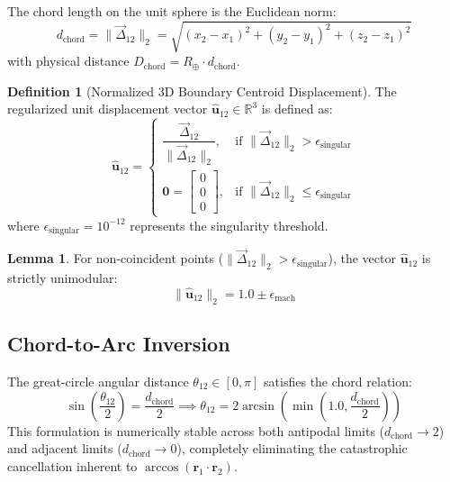 \documentclass[11pt,a4paper]{article}
\theoremstyle{definition}
\newtheorem{definition}{Definition}
\newtheorem{lemma}{Lemma}
\begin{document}
The chord length on the unit sphere is the Euclidean norm:
\begin{equation}
d_{\text{chord}} = \|\vec{\Delta}_{12}\|_2 = \sqrt{(x_2 - x_1)^2 + (y_2 - y_1)^2 + (z_2 - z_1)^2}
\end{equation}
with physical distance $D_{\text{chord}} = R_{\oplus} \cdot d_{\text{chord}}$.

\begin{definition}[Normalized 3D Boundary Centroid Displacement]
The regularized unit displacement vector $\hat{\mathbf{u}}_{12} \in \mathbb{R}^3$ is defined as:
\begin{equation}
\hat{\mathbf{u}}_{12} = 
\begin{cases}
\dfrac{\vec{\Delta}_{12}}{\|\vec{\Delta}_{12}\|_2}, & \text{if } \|\vec{\Delta}_{12}\|_2 > \epsilon_{\text{singular}} \\
\mathbf{0} = \begin{bmatrix} 0 \\ 0 \\ 0 \end{bmatrix}, & \text{if } \|\vec{\Delta}_{12}\|_2 \le \epsilon_{\text{singular}}
\end{cases}
\end{equation}
where $\epsilon_{\text{singular}} = 10^{-12}$ represents the singularity threshold.
\end{definition}

\begin{lemma}
For non-coincident points ($\|\vec{\Delta}_{12}\|_2 > \epsilon_{\text{singular}}$), the vector $\hat{\mathbf{u}}_{12}$ is strictly unimodular:
\begin{equation}
\|\hat{\mathbf{u}}_{12}\|_2 = 1.0 \pm \epsilon_{\text{mach}}
\end{equation}
\end{lemma}

\subsection{Chord-to-Arc Inversion}

The great-circle angular distance $\theta_{12} \in [0, \pi]$ satisfies the chord relation:
\begin{equation}
\sin\left(\frac{\theta_{12}}{2}\right) = \frac{d_{\text{chord}}}{2} \implies \theta_{12} = 2 \arcsin\left(\min\left(1.0, \frac{d_{\text{chord}}}{2}\right)\right)
\end{equation}
This formulation is numerically stable across both antipodal limits ($d_{\text{chord}} \to 2$) and adjacent limits ($d_{\text{chord}} \to 0$), completely eliminating the catastrophic cancellation inherent to $\arccos(\mathbf{r}_1 \cdot \mathbf{r}_2)$.
\end{document}
